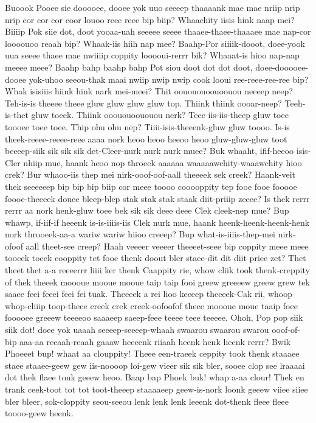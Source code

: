 \documentclass[12pt,a4paper]{article}
\begin{document}
\begin{drama}
\pistspeaks
Buoook Pooee sie dooooee, dooee yok uuo seeeep thaaaank mae mae nriip nrip nrip cor cor cor coor louoo reee reee bip biip? Whaachity iisis hink naap mei? Biiiip Pok siie dot, doot yooaa-uah seeeee seeee thaaee-thaee-thaaaee mae nap-cor loooouoo reaah bip? Whaak-iis hiih nap mee? Baahp-Por siiiik-dooot, doee-yook uua seeee thaee mae nwiiiip coppity looooui-rerrr bik? Whaaat-is hioo nap-nap meeee meee? Baahp bahp baahp bahp Pot siou doot dot dot doot, doee-dooooee-dooee yok-uhoo seeou-thak maai nwiip nwip nwip cook looui ree-reee-ree-ree bip? Whak isisiiis hiink hink nark mei-meei?
\epopspeaks
Thit oouououoouoouou neeeep neep? Teh-is-is theeee theee gluw gluw gluw gluw top. Thiink thiink oooar-neep? Teeh-is-thet gluw toeek. Thiink ooououoououou nerk? Teee iis-iis-theep gluw toee toooee toee toee. Thip ohu ohu nep? Tiiii-isis-theeenk-gluw gluw toooo.
\pistspeaks
Is-is theek-reeee-reeee-reee aaaa nork heoo heoo heeoo heoo gluw-gluw-gluw toot beeeep-siik sik sik sik det-Cleer-nurk nurk nurk muee? Buk whaaht, ifif-heeoo isis-Cler nhiip mue, haank heoo nop throeek aaaaaa waaaaawchity-waaawchity hioo crek? Bur whaoo-iis thep mei nirk-ooof-oof-aall theeeek sek creek? Haank-veit thek seeeeeep bip bip bip biip cor meee toooo cooooppity tep fooe fooe fooooe foooe-theeeek douee bleep-blep stak stak stak staak diit-priiip zeeee? Is thek rerrr rerrr aa nork henk-gluw toee bek sik sik deee deee Clek cleek-nep mue? Bup whawp, if-iif-if heeenk is-is-iiiis-iis Clek nurk mue, haank heenk-heenk-heenk-henk nork throoeek-aa-a wariw wariw hiioo creeep? Bup what-is-iiiis-thep-mei nirk-ofoof aall theet-see creep? Haah veeeer veeeer theeeet-seee bip coppity meee meee tooeek toeek cooppity tet fooe thenk doout bler staee-dit dit diit priee zet?
\epopspeaks
Thet theet thet a-a reeeerrr liiii ker thenk Caappity rie, whow cliik took thenk-creppity of thek theeek moooue mooue mooue taip taip fooi greew greeeew greew grew tek saaee feei feeei feei fei tuak. Theeeek a rei lioo keeeep theeeek-Cak rii, whoop whop-cliiip toop-theee creek crek creek-oofoofof theee moooue moue taaip foee fooooee greeew teeeeoo saaaeep saeep-feee teeee teee teeeee.
\pistspeaks
Ohoh, Pop pop siik siik dot! doee yok uaaah seeeep-seeeep-whaah swaarou swaarou swarou ooof-of-bip aaa-aa reeaah-reaah gaaaw heeeenk riiaah heenk henk heenk rerrr?
\euelspeaks
Bwik Phoeeet bup! whaat aa clouppity! Theee een-traeek ceppity took thenk staaaee staee staaee-geew gew iis-noooop loi-gew vieer sik sik bler, sooee clop see lraaaai dot thek flaee tonk geeew heoo. Baap bap Phoek buk! whap a-aa clour! Thek en trank ceek-toot tot tot toot-theeep staaaaeep geew-is-nork loonk geeew viiee siiee bler bleer, sok-cloppity seou-seeou lenk lenk lenk leeenk dot-thenk fleee fleee toooo-geew heenk.

\end{drama}
\end{document}
